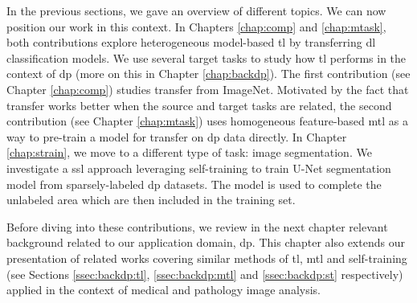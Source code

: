 In the previous sections, we gave an overview of different topics. We can now position our work in this context. In Chapters \ref{chap:comp}
and \ref{chap:mtask}, both contributions explore heterogeneous model-based
\acrlong{tl} by transferring \acrlong{dl} classification models. We use several
target tasks to study how \acrlong{tl} performs in the context of \acrlong{dp}
(more on this in Chapter \ref{chap:backdp}). The first contribution (see Chapter \ref{chap:comp}) studies transfer
from ImageNet. Motivated by the fact that transfer works better when the source
and target tasks are related, the second contribution (see Chapter \ref{chap:mtask}) uses homogeneous feature-based
\acrlong{mtl} as a way to pre-train a model for transfer on \acrlong{dp} data
directly. In Chapter \ref{chap:strain}, we move to a different type of task: image segmentation.
We investigate a \acrlong{ssl} approach leveraging self-training to train U-Net segmentation
model from sparsely-labeled \acrlong{dp} datasets. The model is used to complete the unlabeled area which are 
then included in the training set. 

Before diving into these contributions, we review in the next chapter relevant background related to our application domain, \acrlong{dp}. This chapter also extends our presentation of related works covering similar methods of \acrlong{tl}, \acrlong{mtl} and self-training (see Sections \ref{ssec:backdp:tl}, \ref{ssec:backdp:mtl} and \ref{ssec:backdp:st} respectively) applied in the context of medical and pathology image analysis.